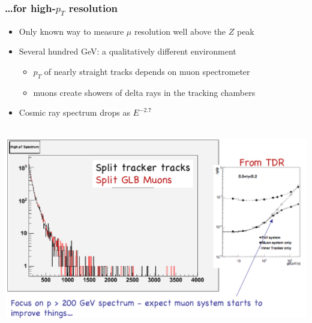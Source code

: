 \documentclass[compress]{beamer}
\begin{document}
\begin{frame}
\frametitle{\ldots for high-$p_T$ resolution}

\begin{itemize}
\item Only known way to measure $\mu$ resolution well above the $Z$ peak
\item Several hundred GeV: a qualitatively different environment
\begin{itemize}
\item $p_T$ of nearly straight tracks depends on muon spectrometer
\item muons create showers of delta rays in the tracking chambers
\end{itemize}
\item Cosmic ray spectrum drops as $E^{-2.7}$
\end{itemize}

\mbox{ } \hfill \includegraphics[width=0.85\linewidth]{track_splitting_high_pT.png} \hfill \mbox{ }
\end{frame}
\end{document}
